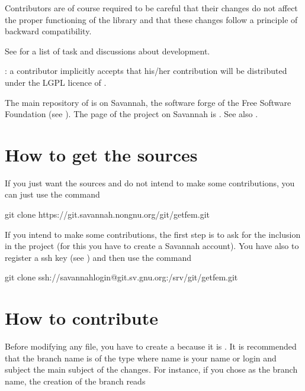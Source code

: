 \documentclass[a4paper,11pt,english]{sphinxmanual}
\begin{document}
Contributors are of course required to be careful that their changes do not affect the proper functioning of the library and that these changes follow a principle of backward compatibility.

See  for a list of task and discussions about  development.

 : a contributor implicitly accepts that his/her contribution will be distributed under the LGPL licence of .

The main repository of  is on Savannah, the software forge of the Free Software Foundation (see ). The page of the project on Savannah is . See also .


\section{How to get the sources}
\label{\detokenize{project/contribute:how-to-get-the-sources}}
If you just want the sources and do not intend to make some contributions, you can just use the command

\begin{sphinxVerbatim}[commandchars=\\\{\}]
git clone https://git.savannah.nongnu.org/git/getfem.git
\end{sphinxVerbatim}

If you intend to make some contributions, the first step is to ask for the inclusion in the  project (for this you have to create a Savannah account). You have also to register a ssh key (see ) and then use the command

\begin{sphinxVerbatim}[commandchars=\\\{\}]
git clone ssh://savannah\PYGZhy{}login@git.sv.gnu.org:/srv/git/getfem.git
\end{sphinxVerbatim}


\section{How to contribute}
\label{\detokenize{project/contribute:how-to-contribute}}
Before modifying any file, you have to create a  because it is . It is recommended that the branch name is of the type  where name is your name or login and subject the main subject of the changes. For instance, if you chose  as the branch name, the creation of the branch reads
\end{document}
